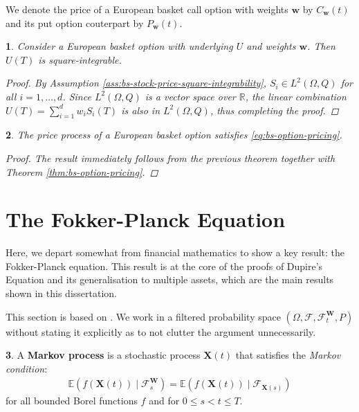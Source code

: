 \documentclass[english]{article}
\numberwithin{equation}{section}
\numberwithin{figure}{section}
\theoremstyle{bolddescit}
\newtheorem{theorem}{\protect\theoremname}[section]
\theoremstyle{definition}
\newtheorem{definition}[theorem]{\protect\definitionname}
\theoremstyle{definition}
\theoremstyle{plain}
\theoremstyle{plain}
\newtheorem{corollary}[theorem]{\protect\corollaryname}
\theoremstyle{bolddesc}
\theoremstyle{plain}
\theoremstyle{remark}
\providecommand{\corollaryname}{Corollary}
\providecommand{\definitionname}{Definition}
\providecommand{\theoremname}{Theorem}
\begin{document}
We denote the price of a European basket call option with weights $\mathbf{w}$ by $C_\mathbf{w}(t)$ and its put option couterpart by $P_\mathbf{w}(t)$.

\begin{theorem}
  Consider a European basket option with underlying $U$ and weights $\mathbf{w}$. Then $U(T)$ is square-integrable.

  \begin{proof}
    By Assumption \ref{ass:bs-stock-price-square-integrability}, $S_i \in L^2(\Omega, Q)$ for all $i=1,\ldots,d$. Since $L^2(\Omega, Q)$ is a vector space over $\mathbb{R}$, the linear combination $U(T) = \sum_{i=1}^{d} w_i S_i(T)$ is also in $L^2(\Omega, Q)$, thus completing the proof.
  \end{proof}
\end{theorem}

\begin{corollary}
  The price process of a European basket option satisfies \eqref{eq:bs-option-pricing}.

  \begin{proof}
    The result immediately follows from the previous theorem together with Theorem \ref{thm:bs-option-pricing}.
  \end{proof}
\end{corollary}

\section{The Fokker-Planck Equation}


Here, we depart somewhat from financial mathematics to show a key result: the Fokker-Planck equation. This result is at the core of the proofs of Dupire's Equation and its generalisation to multiple assets, which are the main results shown in this dissertation.

This section is based on \textcite{pavliotis_stochastic_2014}. We work in a filtered probability space $(\Omega, \mathcal{F}, \mathcal{F}^\mathbf{W}_t, P)$ without stating it explicitly as to not clutter the argument unnecessarily.

\begin{definition}
  A \textbf{Markov process} is a stochastic process $\mathbf{X}(t)$ that satisfies the \textit{Markov condition}:
  \begin{align*}
    \mathbb{E}(f(\mathbf{X}(t)) \mid \mathcal{F}^\mathbf{W}_{s})
    = \mathbb{E}(f(\mathbf{X}(t)) \mid \mathcal{F}_{\mathbf{X}(s)})
  \end{align*}
  for all bounded Borel functions $f$ and for $0 \le s < t \le T$.
\end{definition}
\end{document}

